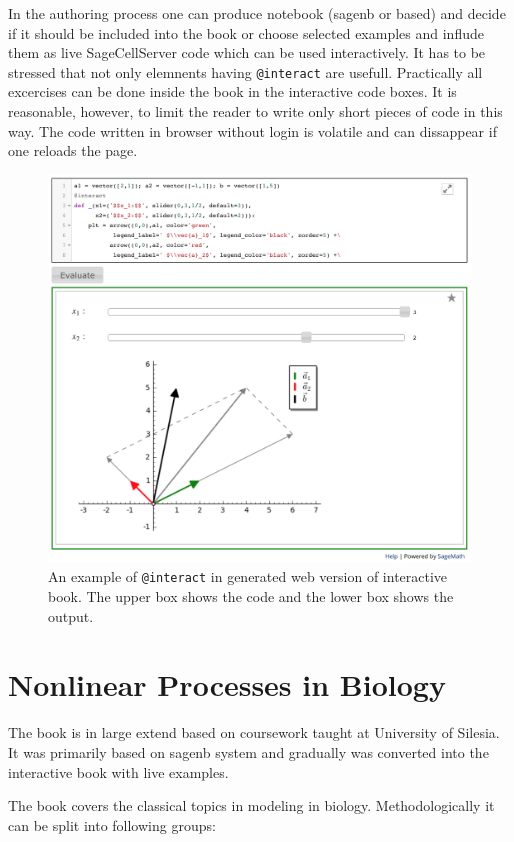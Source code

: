 \documentclass{deliverablereport}
\begin{document}
In the authoring process one can produce notebook (sagenb or \Jupyter
based) and decide if it should be included into the \Sphinx book or
choose selected examples and influde them as live SageCellServer code
which can be used interactively. It has to be stressed that not only
elemnents having \texttt{@interact} are usefull. Practically all 
excercises can be done inside the book in the interactive code
boxes. It is reasonable, however, to limit the reader to write only
short pieces of code in this way.  The code written in browser without
login is volatile and can dissappear if one reloads the page.

\begin{figure}
\centerline{\includegraphics[width=.7\textwidth]{interact_in_sphinx.png}}
\caption{\label{fig:interact_sphinx} An example of \texttt{@interact} in
  \Sphinx generated web version of interactive book. The upper box
  shows the code and the lower box shows the output.}
\end{figure}


\section{ Nonlinear Processes in Biology }



The book is in large extend based on coursework taught at University
of Silesia. It was primarily based on sagenb system and gradually was
converted into the interactive book with live examples.


The book covers the classical topics in modeling in
biology. Methodologically it can be split into following groups:
\end{document}
